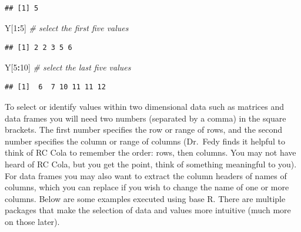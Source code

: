 \documentclass[
]{book}
\newenvironment{Shaded}{\begin{snugshade}}{\end{snugshade}}
\newcommand{\CommentTok}[1]{\textcolor[rgb]{0.56,0.35,0.01}{\textit{#1}}}
\newcommand{\DecValTok}[1]{\textcolor[rgb]{0.00,0.00,0.81}{#1}}
\newcommand{\NormalTok}[1]{#1}
\newcommand{\SpecialCharTok}[1]{\textcolor[rgb]{0.81,0.36,0.00}{\textbf{#1}}}
\begin{document}
\begin{verbatim}
## [1] 5
\end{verbatim}

\begin{Shaded}
\begin{Highlighting}[]
\NormalTok{Y[}\DecValTok{1}\SpecialCharTok{:}\DecValTok{5}\NormalTok{]  }\CommentTok{\# select the first five values}
\end{Highlighting}
\end{Shaded}

\begin{verbatim}
## [1] 2 2 3 5 6
\end{verbatim}

\begin{Shaded}
\begin{Highlighting}[]
\NormalTok{Y[}\DecValTok{5}\SpecialCharTok{:}\DecValTok{10}\NormalTok{]  }\CommentTok{\# select the last five values}
\end{Highlighting}
\end{Shaded}

\begin{verbatim}
## [1]  6  7 10 11 11 12
\end{verbatim}

To select or identify values within two dimensional data such as matrices and data frames you will need two numbers (separated by a comma) in the square brackets. The first number specifies the row or range of rows, and the second number specifies the column or range of columns (Dr.~Fedy finds it helpful to think of RC Cola to remember the order: rows, then columns. You may not have heard of RC Cola, but you get the point, think of something meaningful to you). For data frames you may also want to extract the column headers of names of columns, which you can replace if you wish to change the name of one or more columns. Below are some examples executed using base R. There are multiple packages that make the selection of data and values more intuitive (much more on those later).
\end{document}
